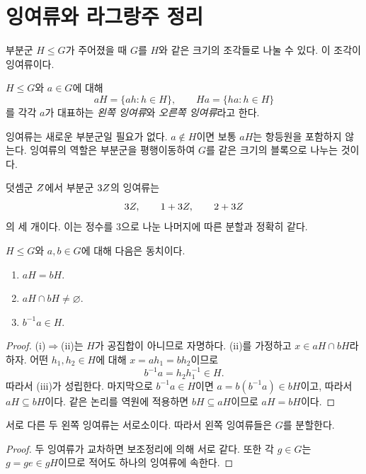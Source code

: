 \section{잉여류와 라그랑주 정리}
\label{sec:cosets-lagrange}

부분군 $H\le G$가 주어졌을 때 $G$를 $H$와 같은 크기의 조각들로 나눌 수 있다. 이 조각이 잉여류이다.

\begin{definition}
$H\le G$와 $a\in G$에 대해
\[
  aH=\{ah:h\in H\},\qquad
  Ha=\{ha:h\in H\}
\]
를 각각 $a$가 대표하는 \emph{왼쪽 잉여류}와 \emph{오른쪽 잉여류}라고 한다.
\end{definition}

잉여류는 새로운 부분군일 필요가 없다. $a\notin H$이면 보통 $aH$는 항등원을 포함하지 않는다. 잉여류의 역할은 부분군을 평행이동하여 $G$를 같은 크기의 블록으로 나누는 것이다.

\begin{example}
덧셈군 $Z$에서 부분군 $3Z$의 잉여류는
\[
  3Z,\qquad 1+3Z,\qquad 2+3Z
\]
의 세 개이다. 이는 정수를 $3$으로 나눈 나머지에 따른 분할과 정확히 같다.
\end{example}

\begin{lemma}[잉여류 판정]
$H\le G$와 $a,b\in G$에 대해 다음은 동치이다.
\begin{enumerate}[label=(\roman*)]
  \item $aH=bH$.
  \item $aH\cap bH\ne\varnothing$.
  \item $b^{-1}a\in H$.
\end{enumerate}
\end{lemma}

\begin{proof}
(i)$\Rightarrow$(ii)는 $H$가 공집합이 아니므로 자명하다. (ii)를 가정하고 $x\in aH\cap bH$라 하자. 어떤 $h_1,h_2\in H$에 대해 $x=ah_1=bh_2$이므로
\[
  b^{-1}a=h_2h_1^{-1}\in H.
\]
따라서 (iii)가 성립한다. 마지막으로 $b^{-1}a\in H$이면 $a=b(b^{-1}a)\in bH$이고, 따라서 $aH\subseteq bH$이다. 같은 논리를 역원에 적용하면 $bH\subseteq aH$이므로 $aH=bH$이다.
\end{proof}

\begin{corollary}
서로 다른 두 왼쪽 잉여류는 서로소이다. 따라서 왼쪽 잉여류들은 $G$를 분할한다.
\end{corollary}

\begin{proof}
두 잉여류가 교차하면 보조정리에 의해 서로 같다. 또한 각 $g\in G$는 $g=ge\in gH$이므로 적어도 하나의 잉여류에 속한다.
\end{proof}

